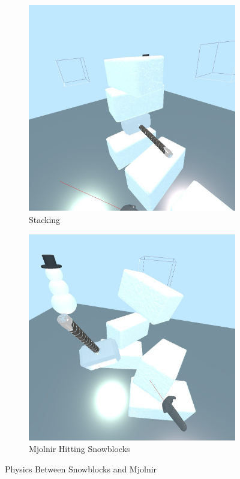 \documentclass[conference,12pt]{IEEEtran}
\begin{document}
\begin{figure}[H]
    \begin{subfigure}{\linewidth}
        \centering
        \includegraphics[width=0.8\linewidth]{screenshots/physics_a.jpg}
        \caption{Stacking}
    \end{subfigure}
    \begin{subfigure}{\linewidth}
        \centering
        \includegraphics[width=0.8\linewidth]{screenshots/physics_b.jpg}
        \caption{Mjolnir Hitting Snowblocks}
    \end{subfigure}
    \caption{Physics Between Snowblocks and Mjolnir}
    \label{fig:physics}
\end{figure}
\end{document}
